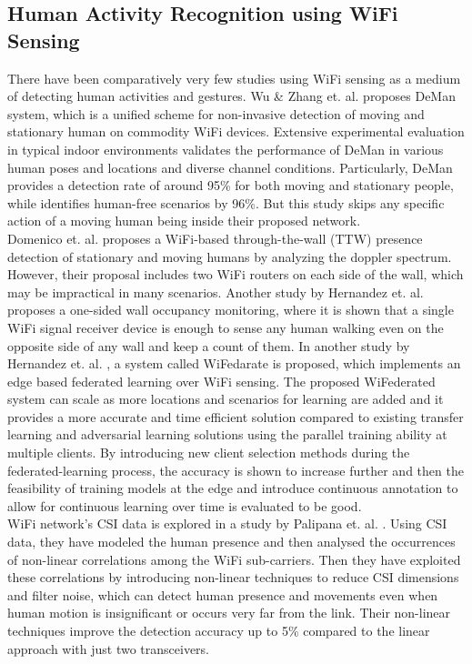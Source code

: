 \documentclass[conference]{IEEEtran}
\begin{document}
\subsection{Human Activity Recognition using WiFi Sensing}
\label{har_wifi}
There have been comparatively very few studies using WiFi sensing as a medium of detecting human activities and gestures. Wu \& Zhang et. al. proposes DeMan\cite{deman} system, which is a unified scheme for non-invasive detection of moving and stationary human on commodity WiFi devices. Extensive experimental evaluation in typical indoor environments validates the performance of DeMan in various human poses and locations and diverse channel conditions. Particularly, DeMan provides a detection rate of around 95\% for both moving and stationary people, while identifies human-free scenarios by 96\%. But this study skips any specific action of a moving human being inside their proposed network.\\
Domenico et. al. \cite{domenico} proposes a WiFi-based through-the-wall (TTW) presence detection of stationary and moving humans by analyzing the doppler spectrum. However, their proposal includes two WiFi routers on each side of the wall, which may be impractical in many scenarios. Another study by Hernandez et. al. \cite{hernandez_one_sided_wall} proposes a one-sided wall occupancy monitoring, where it is shown that a single WiFi signal receiver device is enough to sense any human walking even on the opposite side of any wall and keep a count of them. In another study by Hernandez et. al. \cite{hernandez_wifederate}, a system called WiFedarate is proposed, which implements an edge based federated learning over WiFi sensing. The proposed WiFederated system can scale as more locations and scenarios for learning are added and it provides a more accurate and time efficient solution compared to existing transfer learning and adversarial learning solutions using the parallel training ability at multiple clients. By introducing new client selection methods during the federated-learning process, the accuracy is shown to increase further and then the feasibility of training models at the edge and introduce continuous annotation to allow for continuous learning over time is evaluated to be good.\\
WiFi network's CSI data is explored in a study by Palipana et. al. \cite{csi_human}. Using CSI data, they have modeled the human presence and then analysed the occurrences of non-linear correlations among the WiFi sub-carriers. Then they have exploited these correlations by introducing non-linear techniques to reduce CSI dimensions and filter noise, which can detect human presence and movements even when human motion is insignificant or occurs very far from the link. Their non-linear techniques improve the detection accuracy up to 5\% compared to the linear approach with just two transceivers.\\
\end{document}
